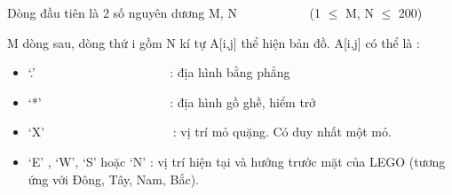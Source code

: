 \textbf{}   Dòng đầu tiên là 2 số nguyên dương M, N            (1  $\le$  M, N  $\le$  200)  

   M dòng sau, dòng thứ i gồm N kí tự A[i,j] thể hiện bản đồ. A[i,j] có thể là :  
\begin{itemize}
	\item     ‘.’                          : địa hình bằng phẳng   
	\item     ‘*’                         : địa hình gồ ghề, hiểm trở   
	\item     ‘X’                         : vị trí mỏ quặng. Có duy nhất một mỏ.   
	\item     ‘E’ , ‘W’, ‘S’ hoặc ‘N’ : vị trí hiện tại và hướng trước mặt của LEGO (tương ứng với Đông, Tây, Nam, Bắc).   
\end{itemize}

\